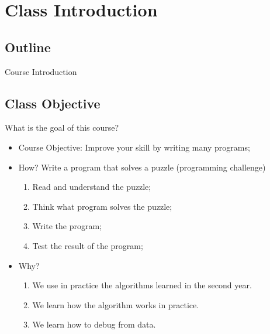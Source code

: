 
\section{Class Introduction}
\subsection{Outline}

\begin{frame}
  \centering
  {\huge
    Course Introduction
  }
\end{frame}

\subsection{Class Objective}
\begin{frame}{What is the goal of this course?}
  \begin{itemize}
    \item \alert{Course Objective}: Improve your skill by writing many programs;
    \bigskip

    \item \alert{How?} Write a program that solves a puzzle (programming challenge)
      \medskip
    \begin{enumerate}
      \item Read and understand the puzzle;
      \item Think what program solves the puzzle;
      \item Write the program;
      \item Test the result of the program;
    \end{enumerate}
    \medskip

    \item \alert{Why?} 
    \begin{enumerate}
      \item We use in practice the algorithms learned in the second year.
      \item We learn how the algorithm works in practice.
      \item We learn how to debug from data.
    \end{enumerate}

  \end{itemize}
\end{frame}

